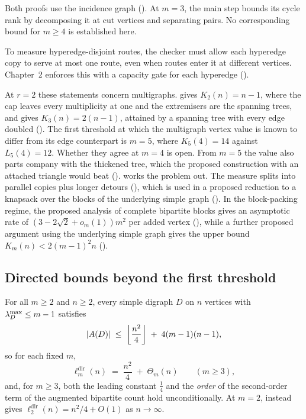 Both proofs use the incidence graph (). At $m=3$, the main step bounds its cycle rank by decomposing it at cut vertices and separating pairs. No corresponding bound for $m\ge4$ is established here.

To measure hyperedge-disjoint routes, the checker must allow each hyperedge copy to serve at most one route, even when routes enter it at different vertices. Chapter~2 enforces this with a capacity gate for each hyperedge ().

At $r=2$ these statements concern multigraphs. 
gives $K_2(n) = n-1$, where the cap leaves every multiplicity at one and the
extremisers are the spanning trees, and  gives
$K_3(n) = 2(n-1)$, attained by a spanning tree with every edge doubled
(). The first threshold at which the multigraph vertex
value is known to differ from its edge counterpart is $m = 5$, where
$K_5(4) = 14$ against $L_5(4) = 12$. Whether they agree at $m = 4$ is open. From
$m = 5$ the value also parts company with the thickened tree, which the proposed construction with an attached triangle would beat
().  works the problem out. The
measure splits into parallel copies plus longer detours
(), which is used in a proposed reduction to a knapsack
over the blocks of the underlying simple graph ().
In the block-packing regime, the proposed analysis of complete bipartite blocks gives an asymptotic rate of
$(3-2\sqrt{2}+o_m(1))m^2$ per added vertex (),
while a further proposed argument using the underlying simple graph gives the upper bound $K_m(n) < 2(m-1)^2n$
().

\subsection{Directed bounds beyond the first threshold}

\begin{theorem}\label{thm:dir-arc-linear-error}
For all $m \ge 2$ and $n \ge 2$, every simple digraph $D$ on $n$ vertices with $\lambda^{\max}_D \le m-1$ satisfies
\[
    |A(D)| \;\le\; \left\lfloor \frac{n^2}{4} \right\rfloor \;+\; 4(m-1)(n-1),
\]
so for each fixed $m$,
\[
    \ell_m^{\mathrm{dir}}(n) \;=\; \frac{n^2}{4} \;+\; \Theta_m(n) \qquad (m\ge3),
\]
and, for $m\ge3$, both the leading constant $\tfrac14$ and the \emph{order} of the second-order term of the augmented bipartite count hold unconditionally. At $m=2$,  instead gives $\ell_2^{\mathrm{dir}}(n)=n^2/4+O(1)$ as $n\to\infty$.
\end{theorem}


